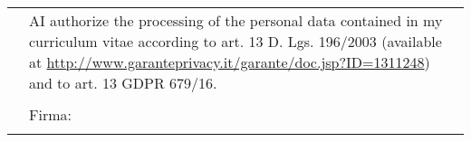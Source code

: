 \documentclass[totpages,helvetica,openbib,english,flagCMYK]{europecv}
\begin{document}
\null{}
\flushright
\begin{tabular}{rp{250pt}}
 & \small AI authorize the processing of the personal data contained in my curriculum vitae according to art. 13 D. Lgs. 196/2003 (available at
 \url{http://www.garanteprivacy.it/garante/doc.jsp?ID=1311248}) and to art. 13 GDPR 679/16.
 \\
 &  \\ 
 & Firma:\\ 
 & \underline{\hspace{250pt}} \\
\end{tabular} 
\end{document}
